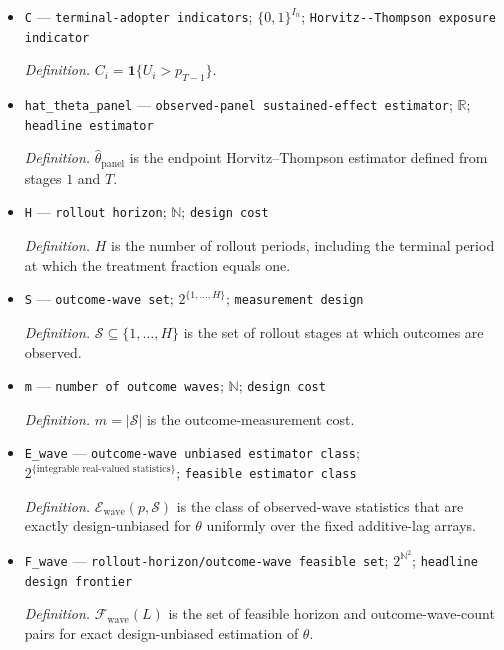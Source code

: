 \documentclass{article}
\begin{document}
\begin{itemize}
  \item \texttt{C} --- \texttt{terminal-\allowbreak{}adopter indicators}; \(\{0,1\}^{I_n}\); \texttt{Horvitz-\allowbreak{}-\allowbreak{}Thompson exposure indicator}
  \par\smallskip\noindent\emph{Definition.} \(C_i=\mathbf 1\{U_i>p_{T-1}\}\).
  \item \texttt{hat\_\allowbreak{}theta\_\allowbreak{}panel} --- \texttt{observed-\allowbreak{}panel sustained-\allowbreak{}effect estimator}; \(\mathbb R\); \texttt{headline estimator}
  \par\smallskip\noindent\emph{Definition.} \(\widehat\theta_{\mathrm{panel}}\) is the endpoint Horvitz--Thompson estimator defined from stages \(1\) and \(T\).
  \item \texttt{H} --- \texttt{rollout horizon}; \(\mathbb N\); \texttt{design cost}
  \par\smallskip\noindent\emph{Definition.} \(H\) is the number of rollout periods, including the terminal period at which the treatment fraction equals one.
  \item \texttt{S} --- \texttt{outcome-\allowbreak{}wave set}; \(2^{\{1,\ldots,H\}}\); \texttt{measurement design}
  \par\smallskip\noindent\emph{Definition.} \(\mathcal S\subseteq\{1,\ldots,H\}\) is the set of rollout stages at which outcomes are observed.
  \item \texttt{m} --- \texttt{number of outcome waves}; \(\mathbb N\); \texttt{design cost}
  \par\smallskip\noindent\emph{Definition.} \(m=|\mathcal S|\) is the outcome-measurement cost.
  \item \texttt{E\_\allowbreak{}wave} --- \texttt{outcome-\allowbreak{}wave unbiased estimator class}; \(2^{\{\text{integrable real-valued statistics}\}}\); \texttt{feasible estimator class}
  \par\smallskip\noindent\emph{Definition.} \(\mathcal E_{\mathrm{wave}}(p,\mathcal S)\) is the class of observed-wave statistics that are exactly design-unbiased for \(\theta\) uniformly over the fixed additive-lag arrays.
  \item \texttt{F\_\allowbreak{}wave} --- \texttt{rollout-\allowbreak{}horizon/\allowbreak{}outcome-\allowbreak{}wave feasible set}; \(2^{\mathbb N^2}\); \texttt{headline design frontier}
  \par\smallskip\noindent\emph{Definition.} \(\mathcal F_{\mathrm{wave}}(L)\) is the set of feasible horizon and outcome-wave-count pairs for exact design-unbiased estimation of \(\theta\).

\end{itemize}
\end{document}
